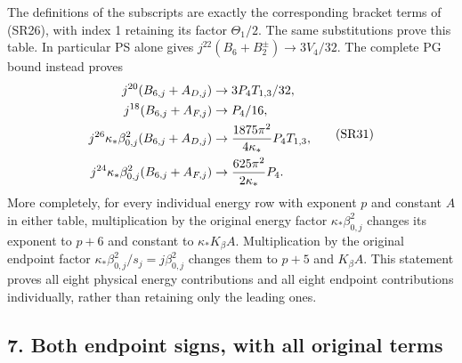 \documentclass[11pt]{article}
\begin{document}
The definitions of the subscripts are exactly the corresponding bracket terms of (SR26), with index 1 retaining its factor \(\Theta_1/2\). The same substitutions prove this table. In particular PS alone gives \(j^{22}(B_6+B_2^\pm)\to3V_4/32\). The complete PG bound instead proves
\[
\begin{aligned}
j^{20}(B_{6,j}+A_{D,j})&\to3P_4T_{1,3}/32,\\
j^{18}(B_{6,j}+A_{F,j})&\to P_4/16,\\
j^{26}\kappa_*\beta_{0,j}^2(B_{6,j}+A_{D,j})
&\to {1875\pi^2\over4\kappa_*}P_4T_{1,3},\\
j^{24}\kappa_*\beta_{0,j}^2(B_{6,j}+A_{F,j})
&\to {625\pi^2\over2\kappa_*}P_4.
\end{aligned}\tag{SR31}
\]
More completely, for every individual energy row with exponent \(p\) and constant \(A\) in either table, multiplication by the original energy factor \(\kappa_*\beta_{0,j}^2\) changes its exponent to \(p+6\) and constant to \(\kappa_*K_\beta A\). Multiplication by the original endpoint factor \(\kappa_*\beta_{0,j}^2/s_j=j\beta_{0,j}^2\) changes them to \(p+5\) and \(K_\beta A\). This statement proves all eight physical energy contributions and all eight endpoint contributions individually, rather than retaining only the leading ones.

\subsection*{7. Both endpoint signs, with all original terms}
\end{document}
